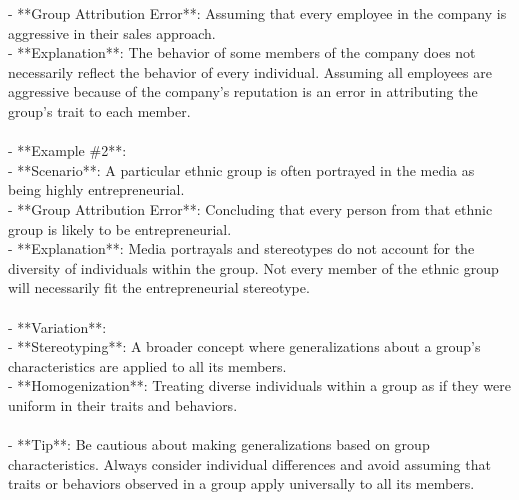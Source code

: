 \documentclass[a4paper,12pt,single,pdftex]{scrbook}
\begin{document}
    
        - **Group Attribution Error**: Assuming that every employee in the company is aggressive in their sales approach.
    \\

    
        - **Explanation**: The behavior of some members of the company does not necessarily reflect the behavior of every individual. Assuming all employees are aggressive because of the company's reputation is an error in attributing the group's trait to each member.
    \\

    
      
    \\

    
      - **Example \#2**:
    \\

    
        - **Scenario**: A particular ethnic group is often portrayed in the media as being highly entrepreneurial.
    \\

    
        - **Group Attribution Error**: Concluding that every person from that ethnic group is likely to be entrepreneurial.
    \\

    
        - **Explanation**: Media portrayals and stereotypes do not account for the diversity of individuals within the group. Not every member of the ethnic group will necessarily fit the entrepreneurial stereotype.
    \\

    
      
    \\

    
      - **Variation**:
    \\

    
        - **Stereotyping**: A broader concept where generalizations about a group’s characteristics are applied to all its members.
    \\

    
        - **Homogenization**: Treating diverse individuals within a group as if they were uniform in their traits and behaviors.
    \\

    
      
    \\

    
      - **Tip**: Be cautious about making generalizations based on group characteristics. Always consider individual differences and avoid assuming that traits or behaviors observed in a group apply universally to all its members.
    \\
\end{document}
